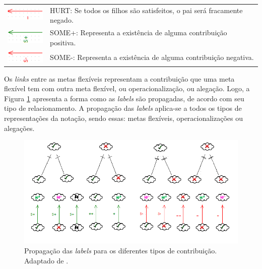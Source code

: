\begin{table}[h!]
\begin{tabular}{@{}cl@{}}
		\multirow{2}{*}{\includegraphics[scale=0.9]{figuras/Hurt.png}} & \multirow{2}{*}{HURT: Se todos os filhos são satisfeitos, o pai será fracamente negado.} \\
		&  \\ \hline
		\multirow{2}{*}{\includegraphics[scale=0.9]{figuras/SomeMais.png}} & \multirow{2}{*}{SOME+: Representa a existência de alguma contribuição positiva.} \\
		&  \\ \hline
		\multirow{2}{*}{\includegraphics[scale=0.9]{figuras/SomeMenos.png}} & \multirow{2}{*}{SOME-: Representa a existência de alguma contribuição negativa.} \\
		&  \\ \hline
	\end{tabular}
\end{table}


Os \textit{links} entre as metas flexíveis representam a contribuição que uma meta flexível tem com outra meta flexível, ou operacionalização, ou alegação. Logo, a Figura \ref{catalogoDeAvaliação} apresenta a forma como as \textit{labels} são propagadas, de acordo com seu tipo de relacionamento. A propagação das \textit{labels} aplica-se a todos os tipos de representações da notação, sendo essas: metas flexíveis, operacionalizações ou alegações. 

\begin{figure}[h!]
	\centering
	\includegraphics[keepaspectratio=true,scale=0.8]{figuras/catalogoDeAvaliacao.png}
	\caption{Propagação das \textit{labels} para os diferentes tipos de contribuição. Adaptado de \cite{chung2012non}.}
	\label{catalogoDeAvaliação}
\end{figure} 

